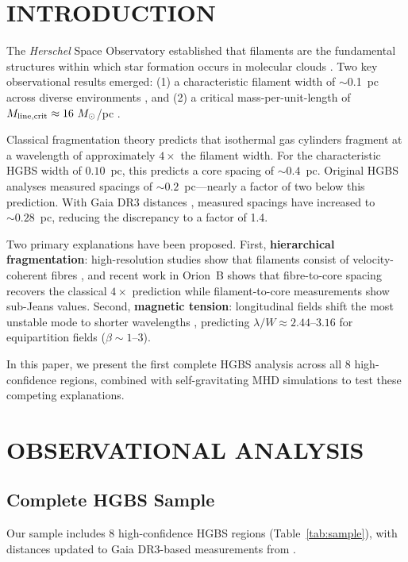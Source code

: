 \documentclass[twoside,twocolumn]{mnras}
\begin{document}
\section{INTRODUCTION}

The \textit{Herschel} Space Observatory established that filaments are the fundamental
structures within which star formation occurs in molecular clouds \citep{Andre2010}.
Two key observational results emerged: (1) a characteristic filament width of $\sim$0.1~pc
across diverse environments \citep{Arzoumanian2011}, and (2) a critical mass-per-unit-length
of $M_{\rm line,crit} \approx 16~M_\odot$/pc \citep{Ostriker1964}.

Classical fragmentation theory \citep{Inutsuka1992} predicts that isothermal gas cylinders
fragment at a wavelength of approximately $4\times$ the filament width. For the
characteristic HGBS width of $0.10$~pc, this predicts a core spacing of $\sim 0.4$~pc.
Original HGBS analyses measured spacings of $\sim 0.2$~pc---nearly a factor of two below
this prediction. With Gaia DR3 distances \citep{Zhang2023}, measured spacings have
increased to $\sim 0.28$~pc, reducing the discrepancy to a factor of 1.4.

Two primary explanations have been proposed. First, \textbf{hierarchical fragmentation}:
high-resolution studies show that filaments consist of velocity-coherent fibres
\citep{Hacar2013}, and recent work in Orion~B \citep{Yang2024} shows that fibre-to-core
spacing recovers the classical $4\times$ prediction while filament-to-core measurements
show sub-Jeans values. Second, \textbf{magnetic tension}: longitudinal fields shift the
most unstable mode to shorter wavelengths \citep{Nakamura1993}, predicting
$\lambda/W \approx 2.44$--$3.16$ for equipartition fields ($\beta \sim 1$--$3$).

In this paper, we present the first complete HGBS analysis across all 8 high-confidence
regions, combined with self-gravitating MHD simulations to test these competing
explanations.

\section{OBSERVATIONAL ANALYSIS}

\subsection{Complete HGBS Sample}
\label{sec:sample}

Our sample includes 8 high-confidence HGBS regions (Table~\ref{tab:sample}), with
distances updated to Gaia DR3-based measurements from \citet{Zhang2023}.
\end{document}

